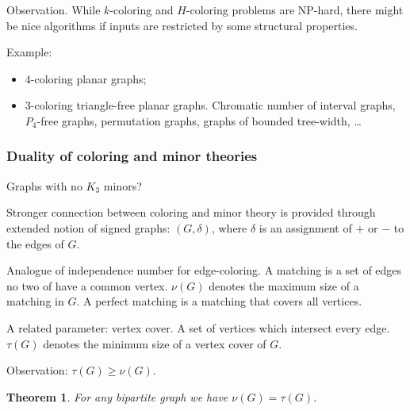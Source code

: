 \documentclass[12pt,a4paper]{article}
\newtheorem{theorem}{Theorem}
\begin{document}
Observation.  While \(k\)-coloring and \(H\)-coloring problems are NP-hard,
there might be nice algorithms if inputs are restricted by some structural
properties.

Example:
\begin{itemize}
\item \(4\)-coloring planar graphs;
\item \(3\)-coloring triangle-free planar graphs.  Chromatic number of interval
  graphs, \(P_4\)-free graphs, permutation graphs, graphs of bounded tree-width,
  …
\end{itemize}

\subsubsection{Duality of coloring and minor theories}
Graphs with no \(K_3\) minors?

Stronger connection between coloring and minor theory is provided through
extended notion of signed graphs: \((G, \delta)\), where \(\delta\) is an
assignment of \(+\) or \(-\) to the edges of \(G\).

Analogue of independence number for edge-coloring.  A matching is a set of edges
no two of have a common vertex.  \(\nu(G)\) denotes the maximum size of a
matching in \(G\).  A perfect matching is a matching that covers all vertices.

A related parameter: vertex cover.  A set of vertices which intersect every
edge.  \(\tau(G)\) denotes the minimum size of a vertex cover of \(G\).

Observation: \(\tau(G) \geq \nu(G)\).

\begin{theorem}
  For any bipartite graph we have \(\nu(G) = \tau(G)\).
\end{theorem}
\end{document}
